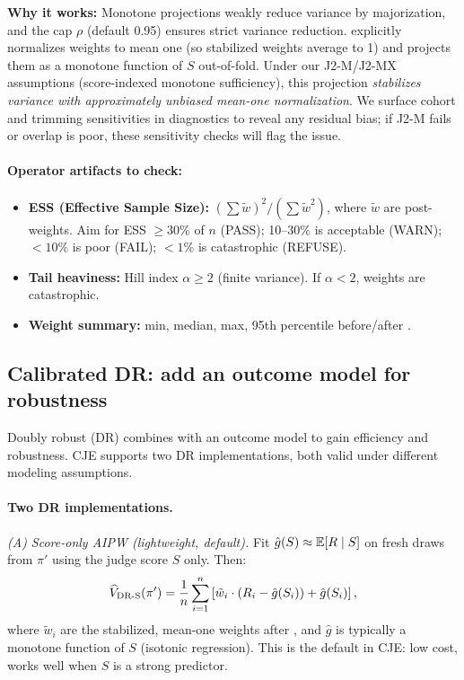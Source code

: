 \textbf{Why it works:} Monotone projections weakly reduce variance by majorization, and the cap $\rho$ (default 0.95) ensures strict variance reduction. \simcal{} explicitly normalizes weights to mean one (so stabilized weights average to 1) and projects them as a monotone function of $S$ out-of-fold. Under our J2-M/J2-MX assumptions (score-indexed monotone sufficiency), this projection \emph{stabilizes variance with approximately unbiased mean-one normalization}. We surface cohort and trimming sensitivities in diagnostics to reveal any residual bias; if J2-M fails or overlap is poor, these sensitivity checks will flag the issue.

\paragraph{Operator artifacts to check:}
\begin{itemize}
\item \textbf{ESS (Effective Sample Size):} $({\textstyle\sum} \tilde{w})^2 / ({\textstyle\sum} \tilde{w}^2)$, where $\tilde{w}$ are post-\simcal{} weights. Aim for ESS $\ge 30\%$ of $n$ (PASS); 10--30\% is acceptable (WARN); $< 10\%$ is poor (FAIL); $< 1\%$ is catastrophic (REFUSE).
\item \textbf{Tail heaviness:} Hill index $\alpha \ge 2$ (finite variance). If $\alpha < 2$, weights are catastrophic.
\item \textbf{Weight summary:} min, median, max, 95th percentile before/after \simcal.
\end{itemize}

\subsection{Calibrated DR: add an outcome model for robustness}

Doubly robust (DR) combines \ips{} with an outcome model to gain efficiency and robustness. CJE supports two DR implementations, both valid under different modeling assumptions.

\paragraph{Two DR implementations.}

\emph{(A) Score-only AIPW (lightweight, default).} Fit $\hat{g}(S) \approx \operatorname{\mathbb{E}}[R \mid S]$ on fresh draws from $\pi'$ using the judge score $S$ only. Then:
\begin{equation}
\widehat{V}_{\text{DR-S}}(\pi') = \frac{1}{n} \sum_{i=1}^n \left[ \tilde{w}_i \cdot (R_i - \hat{g}(S_i)) + \hat{g}(S_i) \right],
\end{equation}
where $\tilde{w}_i$ are the stabilized, mean-one weights after \simcal, and $\hat{g}$ is typically a monotone function of $S$ (isotonic regression). This is the default in CJE: low cost, works well when $S$ is a strong predictor.


